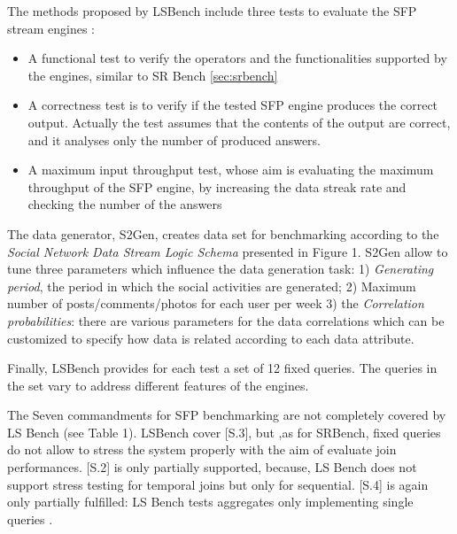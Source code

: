 The methods proposed by LSBench include three tests to evaluate the SFP stream engines \cite{DBLP:conf/semweb/DellAglioCBCV13}:
\begin{itemize}
\item A functional test to verify the operators and the functionalities supported
by the engines, similar to SR Bench \ref{sec:srbench}
\item A correctness test is to verify if the tested SFP engine produces the correct output. Actually the test assumes that the contents of the output are correct, and it analyses only the number of produced answers.
\item A maximum input throughput test, whose aim is evaluating the maximum throughput of the SFP engine, by increasing the data streak rate and checking the number of the answers
\end{itemize}


The data generator, S2Gen, creates data set for benchmarking according to the \textit{Social Network Data Stream Logic Schema} presented in \cite{LePhuoc2012c} Figure 1. S2Gen allow to tune three parameters which influence the data generation task: 1) \textit{Generating period}, the period in which the social activities are generated; 2) Maximum number of posts/comments/photos for each user per week 3) the \textit{Correlation probabilities}: there are various parameters for the data correlations which can be customized to specify how data is related according to each data attribute.

Finally, LSBench \cite{LePhuoc2012c} provides for each test a set of 12 fixed queries. The queries in the set vary to address different features of the engines. 

The Seven commandments for SFP benchmarking are not completely covered by LS Bench (see \cite{DBLP:conf/esws/ScharrenbachUMVB13} Table 1). LSBench cover [S.3], but ,as for SRBench, fixed queries do not allow to stress the system properly with the aim of evaluate join performances. [S.2] is only partially supported, because, LS Bench does not support stress testing for temporal joins but only for sequential. [S.4] is again only partially fulfilled: LS Bench tests aggregates only implementing single queries \cite{DBLP:conf/esws/ScharrenbachUMVB13}.

